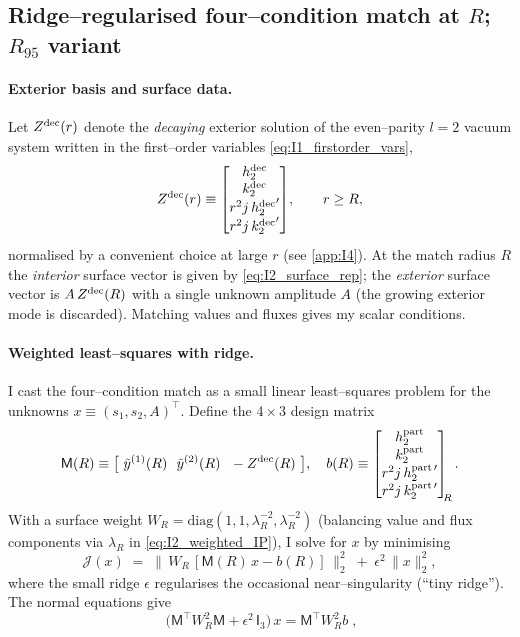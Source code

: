 \documentclass{iopjournal}
\begin{document}
\subsection{\texorpdfstring{Ridge–regularised four–condition match at $R$; $R_{95}$ variant}{Ridge-regularised four-condition match at R; R95 variant}}\label{app:I3}
\paragraph{Exterior basis and surface data.}
Let $Z^{\rm dec}(r)$ denote the \emph{decaying} exterior solution of the even–parity $l=2$ vacuum system written in the first–order variables \eqref{eq:I1_firstorder_vars},
\[
Z^{\rm dec}(r)\equiv
\begin{bmatrix}
h_2^{\rm dec}\\ k_2^{\rm dec}\\ r^{2}j\,{h_2^{\rm dec}}'\\ r^{2}j\,{k_2^{\rm dec}}'
\end{bmatrix}\!,
\qquad r\ge R,
\]
normalised by a convenient choice at large $r$ (see \cref{app:I4}). At the match radius $R$ the \emph{interior} surface vector is given by \eqref{eq:I2_surface_rep}; the \emph{exterior} surface vector is $A\,Z^{\rm dec}(R)$ with a single unknown amplitude $A$ (the growing exterior mode is discarded). Matching values and fluxes gives my scalar conditions.

\paragraph{Weighted least–squares with ridge.}
I cast the four–condition match as a small linear least–squares problem for the unknowns $x\equiv(s_1,s_2,A)^{\!\top}$. Define the $4\times3$ design matrix
\[
\mathsf M(R)\equiv \big[\ \tilde y^{(1)}(R)\ \ \tilde y^{(2)}(R)\ \ -Z^{\rm dec}(R)\ \big],
\quad
b(R)\equiv
\begin{bmatrix}h_2^{\rm part}\\ k_2^{\rm part}\\ r^{2}j\,h_2^{\rm part\,\prime}\\ r^{2}j\,k_2^{\rm part\,\prime}\end{bmatrix}_{\!\!R}.
\]
With a surface weight $W_R=\mathrm{diag}(1,1,\lambda_R^{-2},\lambda_R^{-2})$ (balancing value and flux components via $\lambda_R$ in \eqref{eq:I2_weighted_IP}), I solve for $x$ by minimising
\begin{equation}
\mathcal J(x)\;=\;\big\|\,W_R\,[\mathsf M(R)\,x-b(R)]\,\big\|_2^{2}\;+\;\epsilon^2\,\|x\|_2^{2},
\label{eq:I3_objective}
\end{equation}
where the small ridge $\epsilon$ regularises the occasional near–singularity (``tiny ridge''). The normal equations give
\begin{equation}
\boxed{\;
\big(\mathsf M^\top W_R^{2}\mathsf M+\epsilon^2\,\mathsf I_3\big)\,x
=\mathsf M^\top W_R^{2} b\;,
}
\label{eq:I3_ridge_system}
\end{equation}
\end{document}
